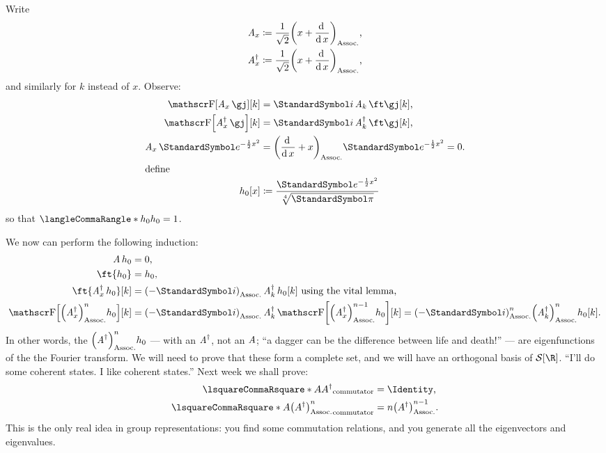 \documentclass[10pt, a4paper, twoside]{lecturenotes}
\newcommand{\opAdag}{\adj{\opA}}
\begin{document}
\begin{lecture}[date=2013-03-26]
Write 
\begin{align*}
\opA_x&\DefineAs\frac{1}{\sqrt{2}}\pa{x+\derivop x}\text,\\
\adj{\opA_x}&\DefineAs\frac{1}{\sqrt{2}}\pa{x+\derivop x}\text{,}
\end{align*}
and similarly for $k$ instead of $x$.
Observe:
\begin{align*}
\FT\of {\opA_x \gj}\of k &= \I \opA_k \ft\gj\of k\text,\\
\FT\of {\adj{\opA_x} \gj}\of k &= \I \adj{\opA_k} \ft\gj\of k\text,\\
\opA_x\E^{-\frac{1}{2}x^2}&=\pa{\derivop x+x}\E^{-\frac{1}{2}x^2}= 0\text{.}\\
\intertext{define}
h_0\of x &\DefineAs \frac{\E^{-\frac{1}{2}x^2}}{\sqrt[4]{\Pi}}\\
\end{align*}
so that $\LTwoInner {h_0}{h_0} = 1$.

We now can perform the following induction:
\begin{align*}
\opA h_0&=0\text, \\
\ft{h_0}&= h_0\text,\\
\ft{\adj {\opA_x} h_0}\of k &=\pa{-\I}\adj{\opA_k} h_0\of k\text{ using the vital lemma,}\\
\FT\of{\pa{\adj{\opA_x}}^n h_0}\of k &= \pa{-\I} \adj{\opA_k}\FT\of{\pa{\adj \opA_x}^{n-1}h_0}\of k
= \pa{-\I}^n \pa{\adj{\opA_k}}^n h_0\of k\text.
\end{align*}
In other words, the $\pa{\opAdag}^n h_0$ --- with an $\opAdag$, not an $\operatorname{\mathit{A}}$; ``a dagger can be the difference between life and death!'' --- are eigenfunctions of the the Fourier transform. We will need to prove that these form a complete set, and we will have an orthogonal basis of $\SchwartzSpace\of\R$.
``I'll do some coherent states. I like coherent states.'' Next week we shall prove:
\begin{align*}
\commutator A {\adj A} &= \Identity \text,\\
\commutator A {\pa{\adj A}^n} &= n \pa{\adj A}^{n-1} \text.
\end{align*}
This is the only real idea in group representations: you find some commutation relations, and you generate all the eigenvectors and eigenvalues.

\end{lecture}
\end{document}

